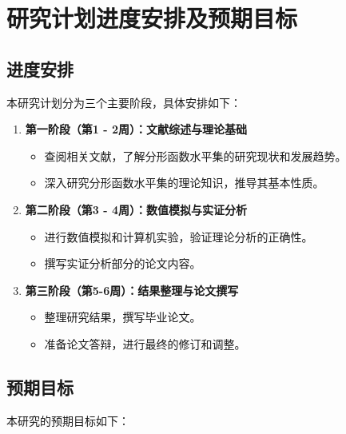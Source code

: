 \section{研究计划进度安排及预期目标}

\subsection{进度安排}
\label{sec:schedule}

本研究计划分为三个主要阶段，具体安排如下：

\begin{enumerate}
      \item \textbf{第一阶段（第1 - 2周）：文献综述与理论基础}
      \begin{itemize}
            \item 查阅相关文献，了解分形函数水平集的研究现状和发展趋势。
            \item 深入研究分形函数水平集的理论知识，推导其基本性质。
      \end{itemize}
      \item \textbf{第二阶段（第3 - 4周）：数值模拟与实证分析}
      \begin{itemize}
            \item 进行数值模拟和计算机实验，验证理论分析的正确性。
            \item 撰写实证分析部分的论文内容。
      \end{itemize}
      \item \textbf{第三阶段（第5-6周）：结果整理与论文撰写}
      \begin{itemize}
            \item 整理研究结果，撰写毕业论文。
            \item 准备论文答辩，进行最终的修订和调整。
      \end{itemize}
\end{enumerate}

\subsection{预期目标}
\label{sec:expected_goals}

本研究的预期目标如下：

